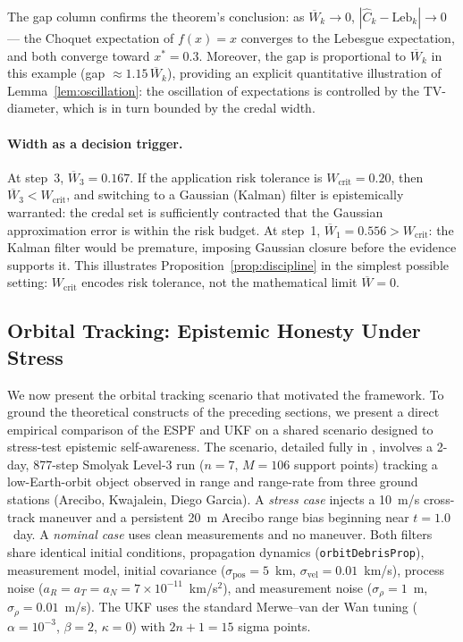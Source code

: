 \documentclass[12pt]{article}
\begin{document}
The gap column confirms the theorem's conclusion: as $\overline{W}_k\to 0$,
$|\widehat{C}_k - \mathrm{Leb}_k|\to 0$ --- the Choquet expectation of $f(x)=x$
converges to the Lebesgue expectation, and both converge toward $x^*=0.3$.
Moreover, the gap is proportional to $\overline{W}_k$ in this example
(gap $\approx 1.15\,\overline{W}_k$), providing an explicit quantitative
illustration of Lemma~\ref{lem:oscillation}: the oscillation of expectations
is controlled by the TV-diameter, which is in turn bounded by the credal width.

\paragraph{Width as a decision trigger.}
At step~3, $\overline{W}_3 = 0.167$.
If the application risk tolerance is $W_\mathrm{crit} = 0.20$,
then $\overline{W}_3 < W_\mathrm{crit}$, and switching to a Gaussian
(Kalman) filter is epistemically warranted: the credal set is
sufficiently contracted that the Gaussian approximation error is
within the risk budget.
At step~1, $\overline{W}_1 = 0.556 > W_\mathrm{crit}$: the Kalman
filter would be premature, imposing Gaussian closure before the
evidence supports it.
This illustrates Proposition~\ref{prop:discipline} in the simplest
possible setting: $W_\mathrm{crit}$ encodes risk tolerance, not the
mathematical limit $\overline{W}=0$.

\subsection{Orbital Tracking: Epistemic Honesty Under Stress}
\label{sec:orbital_example}

We now present the orbital tracking scenario that motivated the framework.
To ground the theoretical constructs of the preceding sections, we present a
direct empirical comparison of the ESPF and UKF on a shared scenario
designed to stress-test epistemic self-awareness.
The scenario, detailed fully in \cite{jah2026optimality}, involves a 2-day,
877-step Smolyak Level-3 run ($n=7$, $M=106$ support points) tracking a
low-Earth-orbit object observed in range and range-rate from three ground
stations (Arecibo, Kwajalein, Diego Garcia).
A \emph{stress case} injects a 10~m/s cross-track maneuver and a persistent
20~m Arecibo range bias beginning near $t = 1.0$~day.
A \emph{nominal case} uses clean measurements and no maneuver.
Both filters share identical initial conditions, propagation dynamics
(\texttt{orbitDebrisProp}), measurement model, initial covariance
($\sigma_\mathrm{pos}=5$~km, $\sigma_\mathrm{vel}=0.01$~km/s), process noise
($a_R = a_T = a_N = 7\times10^{-11}$~km/s$^2$), and measurement noise
($\sigma_\rho = 1$~m, $\sigma_{\dot\rho}=0.01$~m/s).
The UKF uses the standard Merwe--van der Wan tuning
($\alpha=10^{-3}$, $\beta=2$, $\kappa=0$) with $2n+1=15$ sigma points.
\end{document}
